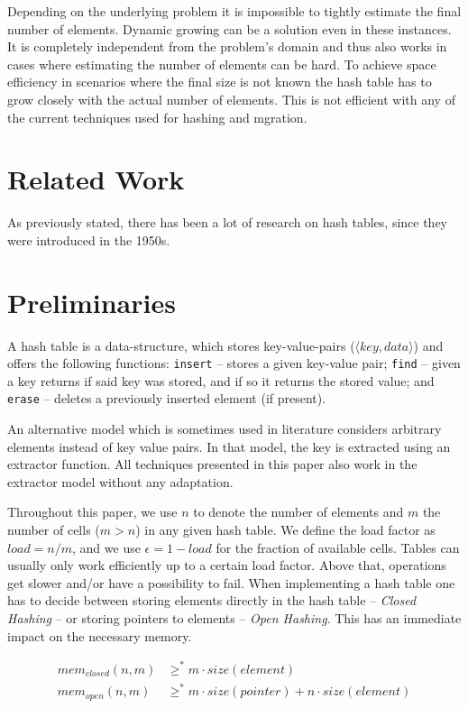 \documentclass[a4paper,UKenglish]{lipics-v2016}
\begin{document}
Depending on the underlying problem it is impossible to tightly
estimate the final number of elements.  Dynamic growing can be a
solution even in these instances.  It is completely independent from
the problem's domain and thus also works in cases where estimating the
number of elements can be hard.  To achieve space efficiency in
scenarios where the final size is not known the hash table has to grow
closely with the actual number of elements.  This is not efficient
with any of the current techniques used for hashing and mgration.

\section{Related Work}
As previously stated, there has been a lot of research on hash tables,
since they were introduced in the 1950s.

\section{Preliminaries}
A hash table is a data-structure, which stores key-value-pairs
($\langle key, data \rangle$) and offers the following functions:
\verb~insert~ -- stores a given key-value pair; \verb~find~ -- given a key returns if
said key was stored, and if so it returns the stored value; and
\verb~erase~ -- deletes a previously inserted element (if present).

An alternative model which is sometimes used in literature considers
arbitrary elements instead of key value pairs.  In that model, the key
is extracted using an extractor function.  All techniques presented in
this paper also work in the extractor model without any adaptation.

Throughout this paper, we use $n$ to denote the number of elements and
$m$ the number of cells ($m > n$) in any given hash table.  We define
the load factor as $load = n/m$, and we use $\epsilon = 1-load$ for
the fraction of available cells.  Tables can usually only work
efficiently up to a certain load factor.  Above that, operations get
slower and/or have a possibility to fail.  When implementing a hash
table one has to decide between storing elements directly in the hash
table -- \emph{Closed Hashing} -- or storing pointers to elements --
\emph{Open Hashing}. This has an immediate impact on the necessary
memory.

\begin{align*}
  mem_{closed}(n,m) &\geq^* m\cdot size(element)\\
  mem_{open}  (n,m) &\geq^* m\cdot size(pointer) + n\cdot size(element)\\
\end{align*}
\end{document}
